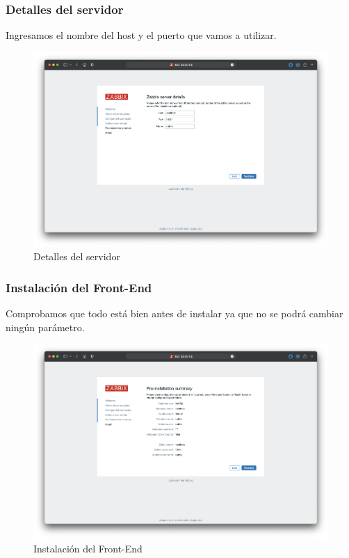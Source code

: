     \subsubsection{Detalles del servidor}
    Ingresamos el nombre del host y el puerto que vamos a utilizar.
    \begin{figure}[H]
        \centering
        \includegraphics[scale=0.25]{images/zabbix_installation_4.png}
        \caption{Detalles del servidor}
        \label{fig:zabbix_installation_4}
    \end{figure} 

    \subsubsection{Instalación del Front-End}
    Comprobamos que todo está bien antes de instalar ya que no se podrá cambiar ningún parámetro.
    \begin{figure}[H]
        \centering
        \includegraphics[scale=0.25]{images/zabbix_installation_5.png}
        \caption{Instalación del Front-End}
        \label{fig:zabbix_installation_5}
    \end{figure}

